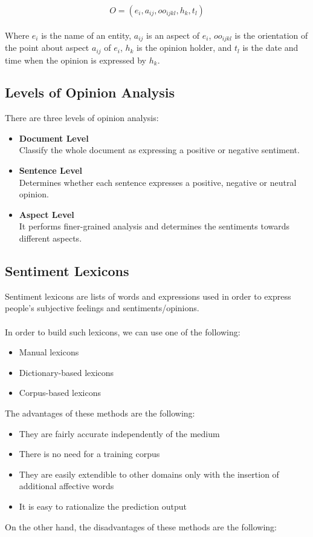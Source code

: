 \documentclass{article}
\begin{document}
\[ O = (e_i, a_{ij}, oo_{ijkl}, h_k, t_l) \] \\
Where $e_i$ is the name of an entity, $a_{ij}$ is an aspect of $e_i$, $oo_{ijkl}$ is the orientation of the point about aspect $a_{ij}$ of $e_i$, $h_k$ is the opinion holder, and $t_l$ is the date and time when the opinion is expressed by $h_k$.

\subsection{Levels of Opinion Analysis}
There are three levels of opinion analysis:

\begin{itemize}
	\item \textbf{Document Level}
	\vspace{.2cm} \\
	Classify the whole document as expressing a positive or negative sentiment.
	
	\item \textbf{Sentence Level}
	\vspace{.2cm} \\
	Determines whether each sentence expresses a positive, negative or neutral opinion.
	
	\item \textbf{Aspect Level}
	\vspace{.2cm} \\
	It performs finer-grained analysis and determines the sentiments towards different aspects.
\end{itemize}

\subsection{Sentiment Lexicons}
Sentiment lexicons are lists of words and expressions used in order to express people's subjective feelings and sentiments/opinions. \\ \\
In order to build such lexicons, we can use one of the following:

\begin{itemize}
	\item Manual lexicons
	\item Dictionary-based lexicons
	\item Corpus-based lexicons
\end{itemize}
The advantages of these methods are the following:

\begin{itemize}
	\item They are fairly accurate independently of the medium
	\item There is no need for a training corpus
	\item They are easily extendible to other domains only with the insertion of additional affective words
	\item It is easy to rationalize the prediction output
\end{itemize}
On the other hand, the disadvantages of these methods are the following:
\end{document}
